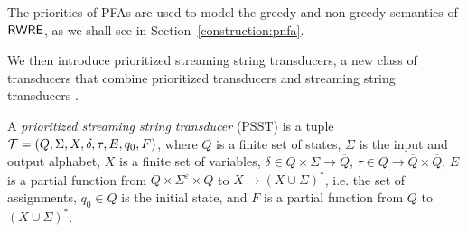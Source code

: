 
The priorities of PFAs are used to model the greedy and non-greedy semantics of ${\sf RWRE}$, as we shall see in Section~\ref{construction:pnfa}.



We then introduce prioritized streaming string transducers, a new class of transducers that combine prioritized transducers \cite{BM17} %
and streaming string transducers \cite{AC10,AD11}.
  
\begin{definition}
A \emph{prioritized streaming string transducer} (PSST) is a tuple $\mathcal{T} = (Q, \Sigma, X, \delta, \tau, E, q_0, F)$, where $Q$ is a
finite set of states, $\Sigma$ is the input and output alphabet, $X$ is a finite set of variables, $\delta \in Q \times \Sigma \rightarrow \overline{Q}$, $\tau \in Q \rightarrow \overline{Q} \times \overline{Q}$, $E$ is a partial function from $Q \times \Sigma^\varepsilon \times
  Q$ to $X \rightarrow (X \cup \Sigma)^{\ast}$, i.e. the set of assignments,
   $q_0 \in Q$ is the initial state, and $F$ is a partial function
  from $Q$ to $(X \cup \Sigma)^{\ast}$.
\end{definition}

